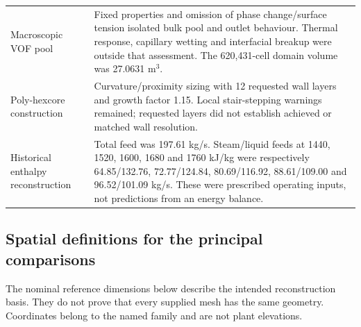 \begin{longtable}{@{}>{\raggedright\arraybackslash}p{0.29000000\dimexpr\linewidth-2\tabcolsep\relax}>{\raggedright\arraybackslash}p{0.71000000\dimexpr\linewidth-2\tabcolsep\relax}@{}}
Macroscopic VOF pool & Fixed properties and omission of phase change/surface tension isolated bulk pool and outlet behaviour. Thermal response, capillary wetting and interfacial breakup were outside that assessment. The 620,431-cell domain volume was 27.0631 m\(^3\). \\
Poly-hexcore construction & Curvature/proximity sizing with 12 requested wall layers and growth factor 1.15. Local stair-stepping warnings remained; requested layers did not establish achieved or matched wall resolution. \\
Historical enthalpy reconstruction & Total feed was 197.61 kg/s. Steam/liquid feeds at 1440, 1520, 1600, 1680 and 1760 kJ/kg were respectively 64.85/132.76, 72.77/124.84, 80.69/116.92, 88.61/109.00 and 96.52/101.09 kg/s. These were prescribed operating inputs, not predictions from an energy balance. \\
\bottomrule
\end{longtable}

\subsection{Spatial definitions for the principal comparisons}

The nominal reference dimensions below describe the intended reconstruction basis. They do not prove that every supplied mesh has the same geometry. Coordinates belong to the named family and are not plant elevations.

